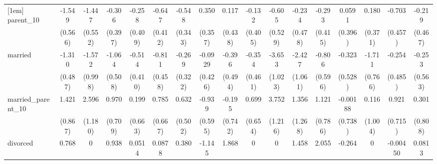 {\begin{tabular}{l*{16}{c}}
[1em]
parent\_10           &      -1.549\sym{**} &      -1.447\sym{**} &      -0.306         &      -0.258         &      -0.647         &      -0.548         &       0.350         &       0.117         &      -0.132         &      -0.605         &      -0.234         &      -0.293         &      0.0591         &       0.180         &      -0.703         &      -0.219         \\
                    &     (0.566)         &     (0.552)         &     (0.397)         &     (0.409)         &     (0.412)         &     (0.343)         &     (0.357)         &     (0.438)         &     (0.405)         &     (0.529)         &     (0.478)         &     (0.415)         &     (0.396)         &     (0.371)         &     (0.457)         &     (0.467)         \\
[1em]
married             &      -1.310\sym{**} &      -1.572         &      -1.064\sym{*}  &      -0.514         &      -0.811         &      -0.269         &     -0.0929         &      -0.396         &      -0.354         &      -3.653\sym{***}&      -2.427\sym{*}  &      -0.806         &      -0.323         &      -1.711\sym{*}  &      -0.254         &      -0.253         \\
                    &     (0.487)         &     (0.998)         &     (0.508)         &     (0.410)         &     (0.458)         &     (0.322)         &     (0.426)         &     (0.494)         &     (0.461)         &     (1.023)         &     (1.061)         &     (0.596)         &     (0.528)         &     (0.766)         &     (0.485)         &     (0.563)         \\
[1em]
married\_parent\_10   &       1.421         &       2.596\sym{*}  &       0.970         &       0.199         &       0.785         &       0.632         &      -0.939         &      -0.195         &       0.699         &       3.752\sym{**} &       1.356         &       1.121         &    -0.00188         &       0.116         &       0.921         &       0.301         \\
                    &     (0.867)         &     (1.180)         &     (0.709)         &     (0.663)         &     (0.667)         &     (0.502)         &     (0.595)         &     (0.742)         &     (0.654)         &     (1.216)         &     (1.268)         &     (0.786)         &     (0.738)         &     (1.004)         &     (0.715)         &     (0.808)         \\
[1em]
divorced            &       0.768         &           0         &       0.938         &      0.0514         &      0.0878         &       0.380         &      -1.145         &       1.868\sym{***}&           0         &           0         &       1.458\sym{*}  &       2.055\sym{**} &      -0.264         &           0         &    -0.00450         &      0.0813         \\

\end{tabular}}
